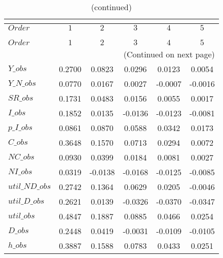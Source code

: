  
\begin{center}
\begin{longtable}{lccccc} 
\caption{COEFFICIENTS OF AUTOCORRELATION}\\
 \label{Table:th_autocorr_matrix}\\
\toprule 
$Order          $	 & 	 $         1$	 & 	 $         2$	 & 	 $         3$	 & 	 $         4$	 & 	 $         5$\\
\midrule \endfirsthead 
\caption{(continued)}\\
 \toprule \\ 
$Order          $	 & 	 $         1$	 & 	 $         2$	 & 	 $         3$	 & 	 $         4$	 & 	 $         5$\\
\midrule \endhead 
\midrule \multicolumn{6}{r}{(Continued on next page)} \\ \bottomrule \endfoot 
\bottomrule \endlastfoot 
$Y\_obs         $	 & 	    0.2700	 & 	    0.0823	 & 	    0.0296	 & 	    0.0123	 & 	    0.0054 \\ 
$Y\_N\_obs      $	 & 	    0.0770	 & 	    0.0167	 & 	    0.0027	 & 	   -0.0007	 & 	   -0.0016 \\ 
$SR\_obs        $	 & 	    0.1731	 & 	    0.0483	 & 	    0.0156	 & 	    0.0055	 & 	    0.0017 \\ 
$I\_obs         $	 & 	    0.1852	 & 	    0.0135	 & 	   -0.0136	 & 	   -0.0123	 & 	   -0.0081 \\ 
$p\_I\_obs      $	 & 	    0.0861	 & 	    0.0870	 & 	    0.0588	 & 	    0.0342	 & 	    0.0173 \\ 
$C\_obs         $	 & 	    0.3648	 & 	    0.1570	 & 	    0.0713	 & 	    0.0294	 & 	    0.0072 \\ 
$NC\_obs        $	 & 	    0.0930	 & 	    0.0399	 & 	    0.0184	 & 	    0.0081	 & 	    0.0027 \\ 
$NI\_obs        $	 & 	    0.0319	 & 	   -0.0138	 & 	   -0.0168	 & 	   -0.0125	 & 	   -0.0085 \\ 
$util\_ND\_obs  $	 & 	    0.2742	 & 	    0.1364	 & 	    0.0629	 & 	    0.0205	 & 	   -0.0046 \\ 
$util\_D\_obs   $	 & 	    0.2621	 & 	    0.0139	 & 	   -0.0326	 & 	   -0.0370	 & 	   -0.0347 \\ 
$util\_obs      $	 & 	    0.4847	 & 	    0.1887	 & 	    0.0885	 & 	    0.0466	 & 	    0.0254 \\ 
$D\_obs         $	 & 	    0.2448	 & 	    0.0419	 & 	   -0.0031	 & 	   -0.0109	 & 	   -0.0105 \\ 
$h\_obs         $	 & 	    0.3887	 & 	    0.1588	 & 	    0.0783	 & 	    0.0433	 & 	    0.0251 \\ 
\end{longtable}
 \end{center}
